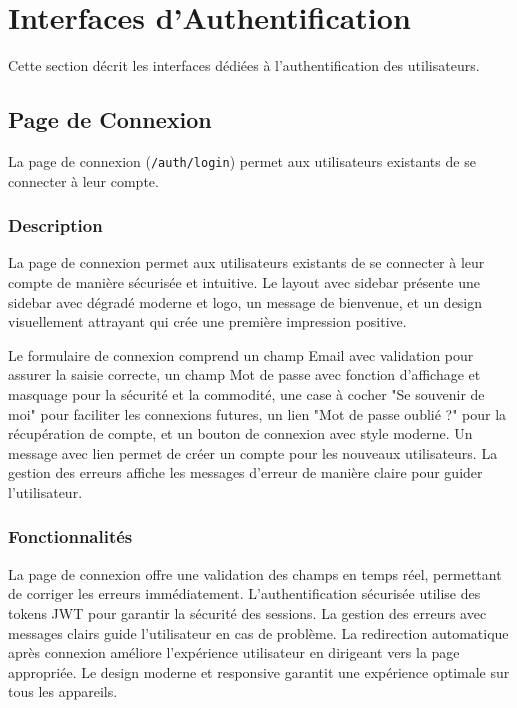 \documentclass[12pt,a4paper]{article}
\begin{document}
\newpage

\section{Interfaces d'Authentification}

Cette section décrit les interfaces dédiées à l'authentification des utilisateurs.

\subsection{Page de Connexion}

La page de connexion (\texttt{/auth/login}) permet aux utilisateurs existants de se connecter à leur compte.

\subsubsection{Description}

La page de connexion permet aux utilisateurs existants de se connecter à leur compte de manière sécurisée et intuitive. Le layout avec sidebar présente une sidebar avec dégradé moderne et logo, un message de bienvenue, et un design visuellement attrayant qui crée une première impression positive.

Le formulaire de connexion comprend un champ Email avec validation pour assurer la saisie correcte, un champ Mot de passe avec fonction d'affichage et masquage pour la sécurité et la commodité, une case à cocher "Se souvenir de moi" pour faciliter les connexions futures, un lien "Mot de passe oublié ?" pour la récupération de compte, et un bouton de connexion avec style moderne. Un message avec lien permet de créer un compte pour les nouveaux utilisateurs. La gestion des erreurs affiche les messages d'erreur de manière claire pour guider l'utilisateur.

\subsubsection{Fonctionnalités}

La page de connexion offre une validation des champs en temps réel, permettant de corriger les erreurs immédiatement. L'authentification sécurisée utilise des tokens JWT pour garantir la sécurité des sessions. La gestion des erreurs avec messages clairs guide l'utilisateur en cas de problème. La redirection automatique après connexion améliore l'expérience utilisateur en dirigeant vers la page appropriée. Le design moderne et responsive garantit une expérience optimale sur tous les appareils.
\end{document}
